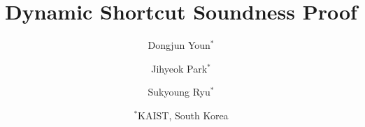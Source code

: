 \documentclass[11pt]{article}
\begin{document}


\title{Dynamic Shortcut Soundness Proof}

\author{Dongjun Youn$^*$ \and Jihyeok Park$^*$ \and Sukyoung Ryu$^*$}

\date{$^*$KAIST, South Korea}
\maketitle


\end{document}
